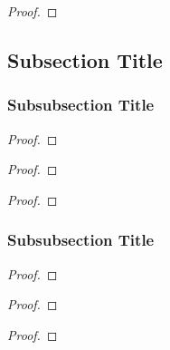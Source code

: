 \begin{coro}
    \lipsum[1]
\end{coro}

\begin{proof}
    \lipsum[1]
\end{proof}

\subsection{Subsection Title}


\begin{defn}
    \lipsum[1]
\end{defn}

\begin{exmp}
    \lipsum[1]
\end{exmp}

\begin{rmrk}
    \lipsum[1]
\end{rmrk}

\subsubsection{Subsubsection Title}

\begin{lemm}
    \lipsum[1]
\end{lemm}

\begin{proof}
    \lipsum[1]
\end{proof}

\begin{thrm}
    \lipsum[1]
\end{thrm}

\begin{proof}
    \lipsum[1]
\end{proof}

\begin{coro}
    \lipsum[1]
\end{coro}

\begin{proof}
    \lipsum[1]
\end{proof}

\subsubsection{Subsubsection Title}

\begin{lemm}
    \lipsum[1]
\end{lemm}

\begin{proof}
    \lipsum[1]
\end{proof}

\begin{thrm}
    \lipsum[1]
\end{thrm}

\begin{proof}
    \lipsum[1]
\end{proof}

\begin{coro}
    \lipsum[1]
\end{coro}

\begin{proof}
    \lipsum[1]
\end{proof}

